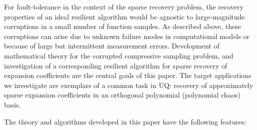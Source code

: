 For fault-tolerance in the context of the sparse recovery problem, the recovery properties of an ideal resilient algorithm would be agnostic to large-magnitude corruptions in a small number of function samples. As described above, these corruptions can arise due to unknown failure modes in computational models or because of large but intermittent measurement errors. Development of mathematical theory for the corrupted compressive sampling problem, and investigation of a corresponding resilient algorithm for sparse recovery of expansion coefficients are the central goals of this paper. The target applications we investigate are exemplars of a common task in UQ: recovery of approximately sparse expansion coefficients in an orthogonal polynomial (polynomial chaos) basis.

The theory and algorithms developed in this paper have the following features: 

